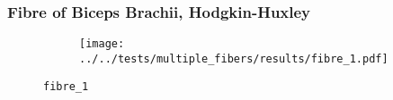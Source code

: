 %
\begin{frame}
  \frametitle{Fibre of Biceps Brachii, Hodgkin-Huxley}
  \vspace*{-0.2cm}
  \begin{figure}[h!]
    \begin{subfigure}[t]{0.5\textwidth}%
    \centering
    \end{subfigure}
    \begin{subfigure}[t]{0.48\textwidth}%
      \centering%
      \texttt{[image: ../../tests/multiple\_fibers/results/fibre\_1.pdf]}%
    \end{subfigure}%
    \caption{\lstinline{fibre_1}}
  \end{figure} 
\end{frame}
%
